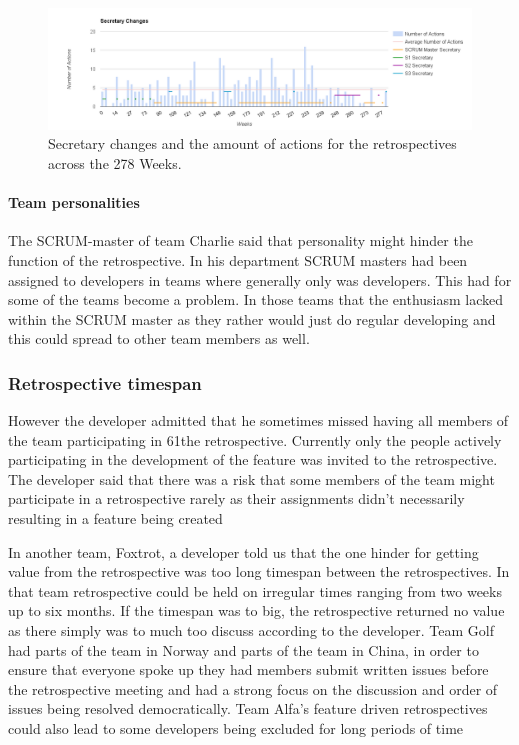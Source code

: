 \begin{figure}
	\centering
	\includegraphics[width=\textwidth, keepaspectratio]{figures/secretary-changes.png}
	\caption{Secretary changes and the amount of actions for the retrospectives across the 278 Weeks.}
	\label{figure:secretary-changes}
\end{figure}

\paragraph{Team personalities}
The SCRUM-master of team Charlie said that personality might hinder the function of the retrospective. In his department SCRUM masters had been assigned to developers in teams where generally only was developers. This had for some of the teams become a problem. In those teams that the enthusiasm lacked within the SCRUM master as they rather would just do regular developing and this could spread to other team members as well. 

\subsubsection{Retrospective timespan}

However the developer admitted
that he sometimes missed having all members of the team participating in
61the retrospective. Currently only the people actively participating in the
development of the feature was invited to the retrospective. The developer
said that there was a risk that some members of the team might participate
in a retrospective rarely as their assignments didn’t necessarily resulting in
a feature being created

In another team, Foxtrot, a developer told us that the one hinder for getting value from the retrospective was too long timespan between the retrospectives. In that team retrospective could be held on irregular times ranging from two weeks up to six months. If the timespan was to big, the retrospective returned no value as there simply was to much too discuss according to the developer. Team Golf had parts of the team in Norway and parts of the team in China, in order to ensure that everyone spoke up they had members submit written issues before the retrospective meeting and had a strong focus on the discussion and order of issues being resolved democratically. Team Alfa's feature driven retrospectives could also lead to some developers being excluded for long periods of time 

